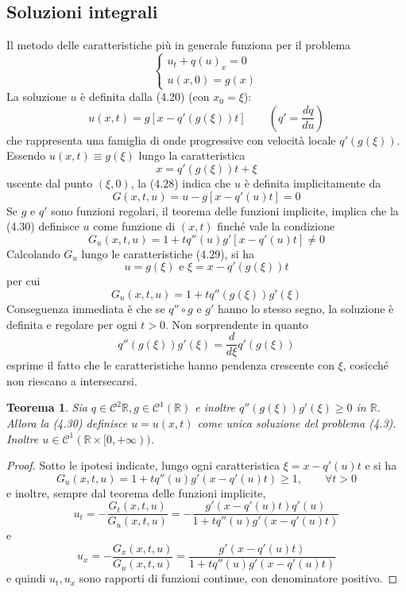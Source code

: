 \documentclass[a4paper,12pt, draft]{article}
\theoremstyle{break}
\newtheorem{theorem}{Teorema}[section]
\numberwithin{equation}{section}
\begin{document}
\subsection{Soluzioni integrali}
Il metodo delle caratteristiche più in generale funziona per il problema 
\begin{equation}
  \begin{cases}
    u_t + q(u)_x = 0 \\
    u(x, 0) = g(x)
  \end{cases}
\end{equation}
La soluzione \(u\) è definita dalla (4.20) (con \(x_0 = \xi\)): 
\begin{equation}
  u(x,t) = g[x - q'(g(\xi))t] \qquad \left(q' = \frac{dq}{du}\right)
\end{equation}
che rappresenta una famiglia di onde progressive con velocità locale \(q'(g(\xi))\). Essendo \(u(x,t) \equiv g(\xi)\) lungo la caratteristica
\begin{equation}
x = q'(g(\xi))t + \xi
\end{equation}
uscente dal punto \((\xi, 0)\), la (4.28) indica che \(u\) è definita implicitamente da 
\begin{equation}
  G(x, t, u) = u - g[x - q'(u)t] = 0
\end{equation}
Se \(g \mbox{ e } q'\) sono funzioni regolari, il teorema delle funzioni implicite, implica che la (4.30) definisce \(u\) come funzione di \((x, t)\) finché vale la condizione 
\[
  G_u(x, t, u) = 1 + t q''(u)g'[x - q'(u)t] \not = 0
\]  
Calcolando \(G_u\) lungo le caratteristiche (4.29), si ha
\[
  u = g(\xi) \mbox{ e } \xi = x - q'(g(\xi))t
\]
per cui 
\begin{equation}
  G_u (x, t, u) = 1 + t q''(g(\xi))g'(\xi)
\end{equation}
Conseguenza immediata è che se \(q'' \circ g\) e \(g'\) hanno lo stesso segno, la soluzione è definita e regolare per ogni \(t > 0\). Non sorprendente in quanto 
\[
q''(g(\xi))g'(\xi) = \frac{d}{d\xi}q'(g(\xi)) 
\]
esprime il fatto che le caratteristiche hanno pendenza crescente con \(\xi\), cosicché non riescano a intersecarsi.
\begin{theorem}
  Sia \(q \in \mathcal{C}^2\mathbb{R}, g\in \mathcal{C}^1(\mathbb{R})\) e inoltre \(q''(g(\xi))g'(\xi) \geq 0\) in \(\mathbb{R}\). Allora la (4.30) definisce \(u = u(x, t)\) come unica soluzione del problema (4.3). Inoltre \(u \in \mathcal{C}^1(\mathbb{R} \times [0, +\infty))\).
\end{theorem}
\begin{proof}
  Sotto le ipotesi indicate, lungo ogni caratteristica \(\xi = x - q'(u)t\) e si ha 
  \[
    G_u (x, t, u) = 1 + tq''(u)g'(x - q'(u)t) \geq 1, \qquad \forall t > 0
  \]
  e inoltre, sempre dal teorema delle funzioni implicite, 
  \[
    u_t = -\frac{G_t(x, t, u)}{G_u(x, t, u)} = -\frac{g'(x-q'(u)t)q'(u)}{1+tq''(u)g'(x - q'(u)t)}
  \]
  e
  \begin{equation}
    u_x = -\frac{G_x(x,t,u)}{G_u(x,t,u)} = \frac{g'(x-q'(u)t)}{1+tq''(u)g'(x-q'(u)t)}
  \end{equation}
  e quindi \(u_t, u_x\) sono rapporti di funzioni continue, con denominatore positivo.
\end{proof}
\end{document}
